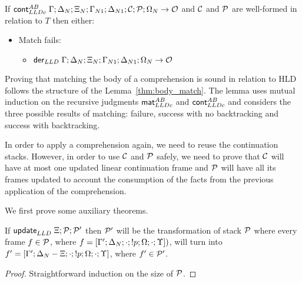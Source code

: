 \begin{lemma}
\begin{itemize}[leftmargin=*]
   

\end{itemize}
   
If $\mathsf{cont}_{LLDc}^{AB} \; \Gamma; \Delta_{N}; \Xi_{N}; \Gamma_{N1}; \Delta_{N1};
\mathcal{C}; \mathcal{P}; \Omega_N \rightarrow \mathcal{O}$ and $\mathcal{C}$ and
$\mathcal{P}$ are well-formed in relation to $T$ then either:

\begin{itemize}[leftmargin=*]
   \item Match fails:
   \begin{itemize}[leftmargin=\secondm]
      \item $\mathsf{der}_{LLD} \; \Gamma; \Delta_N; \Xi_N; \Gamma_{N1}; \Delta_{N1}; \Omega_N \rightarrow \mathcal{O}$
   \end{itemize}

   
\end{itemize}
\end{lemma}

Proving that matching the body of a comprehension is sound in relation to HLD
follows the structure of the Lemma~\ref{thm:body_match}. The lemma uses mutual
induction on the recursive judgments $\mathsf{mat}_{LLDc}^{AB} \;$and $\mathsf{cont}_{LLDc}^{AB} \;$and considers the three
possible results of matching: failure, success with no backtracking and success
with backtracking.

In order to apply a comprehension again, we need to reuse the continuation
stacks. However, in order to use $\mathcal{C}$ and $\mathcal{P}$ safely, we need
to prove that $\mathcal{C}$ will have at most one updated linear continuation
frame and $\mathcal{P}$ will have all its frames updated to account the
consumption of the facts from the previous application of the comprehension.

We first prove some auxiliary theorems.

\begin{theorem}\label{thm:stack_update}
If $\mathsf{update}_{LLD} \; \Xi; \mathcal{P}; \mathcal{P'}$ then $\mathcal{P'}$ will be the
transformation of stack $\mathcal{P}$ where
every frame $f \in \mathcal{P}$, where $f = [\Gamma'; \Delta_N; \cdot; {!} p; \Omega; \cdot;
      \Upsilon])$, will turn into $f' = [\Gamma'; \Delta_N - \Xi; \cdot;
      {!} p; \Omega; \cdot; \Upsilon]$, where $f' \in \mathcal{P'}$.
\end{theorem}
\begin{proof}
Straightforward induction on the size of $\mathcal{P}$.
\end{proof}

